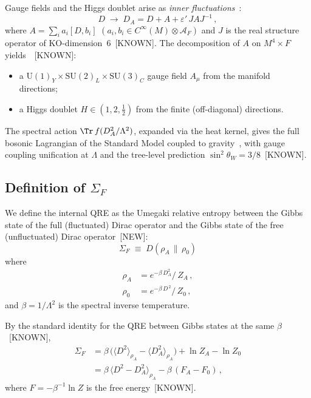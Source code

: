 Gauge fields and the Higgs doublet arise as
\emph{inner fluctuations}~\cite{CC1996,Connes2006}:
\begin{equation}\label{eq:DA}
  D \;\to\; D_A
  = D + A + \varepsilon'\, J A J^{-1}\,,
\end{equation}
where $A = \sum_i a_i [D, b_i]$
$(a_i, b_i \in C^\infty(M) \otimes \mathcal{A}_F)$
and $J$ is the real structure operator of
KO-dimension~$6$~[KNOWN].
The decomposition of $A$ on $M^4 \times F$
yields~\cite{vS2024}~[KNOWN]:
\begin{itemize}
\item a $\mathrm{U}(1)_Y \times \mathrm{SU}(2)_L
\times \mathrm{SU}(3)_C$ gauge field
$A_\mu$ from the manifold directions;
\item a Higgs doublet $H \in (1,2,\tfrac{1}{2})$
from the finite (off-diagonal) directions.
\end{itemize}

The spectral action
$\Tr\, f(D_A^2/\Lambda^2)$, expanded via
the heat kernel, gives the full bosonic
Lagrangian of the Standard Model
coupled to gravity~\cite{CC1996,CC2007,vS2024},
with gauge coupling
unification at $\Lambda$ and the
tree-level prediction
$\sin^2\theta_W = 3/8$~[KNOWN].


\subsection{Definition of $\Sigma_F$}
\label{sec:SigmaF}

We define the internal QRE as
the Umegaki relative entropy between the
Gibbs state of the full (fluctuated) Dirac
operator and the Gibbs state of the free
(unfluctuated) Dirac operator~[NEW]:
\begin{equation}\label{eq:SigmaF_def}
  \boxed{\;
  \Sigma_F
  \;\equiv\;
  D\!\left(\rho_A \,\big\|\, \rho_0\right)
  \;}
\end{equation}
where
\begin{align}
  \rho_A &= e^{-\beta\, D_A^2}\big/\, Z_A\,,
  \label{eq:rhoA}\\
  \rho_0 &= e^{-\beta\, D^{\,2}}\big/\, Z_0\,,
  \label{eq:rho0}
\end{align}
and $\beta = 1/\Lambda^2$ is the spectral
inverse temperature.

By the standard identity for the QRE between
Gibbs states at the same $\beta$~[KNOWN],
\begin{align}\label{eq:SigmaF_expand}
  \Sigma_F
  &= \beta\,\bigl(
    \langle D^2 \rangle_{\!\rho_A}
    - \langle D_A^2 \rangle_{\!\rho_A}
  \bigr)
  + \ln Z_A - \ln Z_0
  \nonumber\\[4pt]
  &= \beta\,\bigl\langle
    D^2 - D_A^2
  \bigr\rangle_{\!\rho_A}
  - \beta\,(F_A - F_0)\,,
\end{align}
where $F = -\beta^{-1}\ln Z$ is the
free energy~[KNOWN].

